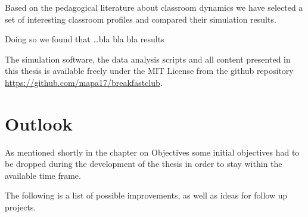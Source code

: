 Based on the pedagogical literature about classroom dynamics we have selected a
set of interesting classroom profiles and compared their simulation results.

Doing so we found that \dots bla bla bla results

The simulation software, the data analysis scripts and all content presented in this
thesis is available freely under the MIT License from the github repository \href{https://github.com/mapa17/breakfastclub}{https://github.com/mapa17/breakfastclub}.



\section{Outlook}
As mentioned shortly in the chapter on Objectives some initial objectives had to
be dropped during the development of the thesis in order to stay within the available
time frame.

The following is a list of possible improvements, as well as ideas for follow up projects.

